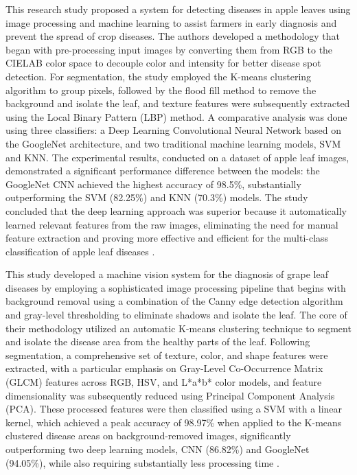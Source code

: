 {This research study proposed a system for detecting diseases in apple leaves using image processing and machine learning to assist farmers in early diagnosis and prevent the spread of crop diseases. The authors developed a methodology that began with pre-processing input images by converting them from RGB to the CIELAB color space to decouple color and intensity for better disease spot detection. For segmentation, the study employed the K-means clustering algorithm to group pixels, followed by the flood fill method to remove the background and isolate the leaf, and texture features were subsequently extracted using the Local Binary Pattern (LBP) method. A comparative analysis was done using three classifiers: a Deep Learning Convolutional Neural Network based on the GoogleNet architecture, and two traditional machine learning models, SVM and KNN. The experimental results, conducted on a dataset of apple leaf images, demonstrated a significant performance difference between the models: the GoogleNet CNN achieved the highest accuracy of 98.5\%, substantially outperforming the SVM (82.25\%) and KNN (70.3\%) models. The study concluded that the deep learning approach was superior because it automatically learned relevant features from the raw images, eliminating the need for manual feature extraction and proving more effective and efficient for the multi-class classification of apple leaf diseases \citep{Alqethami2022}.


This study developed a machine vision system for the diagnosis of grape leaf diseases by employing a sophisticated image processing pipeline that begins with background removal using a combination of the Canny edge detection algorithm and gray-level thresholding to eliminate shadows and isolate the leaf. The core of their methodology utilized an automatic K-means clustering technique to segment and isolate the disease area from the healthy parts of the leaf. Following segmentation, a comprehensive set of texture, color, and shape features were extracted, with a particular emphasis on Gray-Level Co-Occurrence Matrix (GLCM) features across RGB, HSV, and L*a*b* color models, and feature dimensionality was subsequently reduced using Principal Component Analysis (PCA). These processed features were then classified using a SVM with a linear kernel, which achieved a peak accuracy of 98.97\% when applied to the K-means clustered disease areas on background-removed images, significantly outperforming two deep learning models, CNN (86.82\%) and GoogleNet (94.05\%), while also requiring substantially less processing time \citep{Javidan2023}.

}
